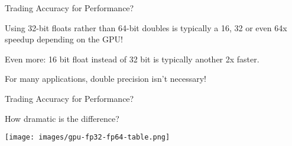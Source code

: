\begin{frame}{Trading Accuracy for Performance?}

Using 32-bit floats rather than 64-bit doubles is typically a 16, 32 or even 64x speedup depending on the GPU!

Even more: 16 bit float instead of 32 bit is typically another 2x faster.

For many applications, double precision isn't necessary!

\end{frame}

\begin{frame}{Trading Accuracy for Performance?}

How dramatic is the difference?

	\begin{center}
		\texttt{[image: images/gpu-fp32-fp64-table.png]}
	\end{center}

\end{frame}



